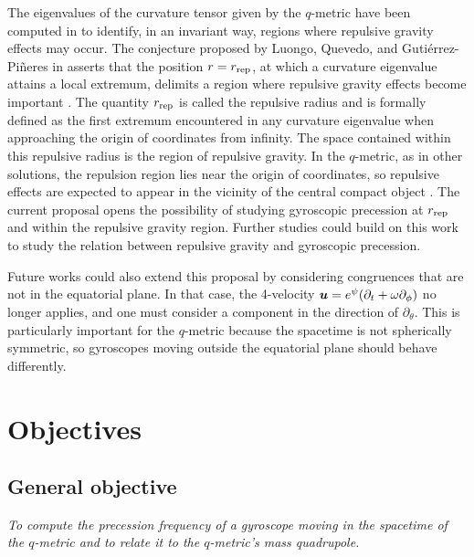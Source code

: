\documentclass[12pt]{article}
\begin{document}
The eigenvalues of the curvature tensor given by the $q$-metric have been computed in \cite{arrieta2021shadows} to identify, in an invariant way, regions where repulsive gravity effects may occur. The conjecture proposed by Luongo, Quevedo, and Gutiérrez-Piñeres in \cite{luongo2014characterizing, gutierrez2019c} asserts that the position $r=r_{\rm rep}$, at which a curvature eigenvalue attains a local extremum, delimits a region where repulsive gravity effects become important \cite{luongo2014characterizing}. The quantity $r_{\rm rep}$ is called the repulsive radius and is formally defined as the first extremum encountered in any curvature eigenvalue when approaching the origin of coordinates from infinity. The space contained within this repulsive radius is the region of repulsive gravity. In the $q$-metric, as in other solutions, the repulsion region lies near the origin of coordinates, so repulsive effects are expected to appear in the vicinity of the central compact object \cite{gutierrez2019c}. The current proposal opens the possibility of studying gyroscopic precession at $r_{\rm rep}$ and within the repulsive gravity region. Further studies could build on this work to study the relation between repulsive gravity and gyroscopic precession.

Future works could also extend this proposal by considering congruences that are not in the equatorial plane. In that case, the 4-velocity $\boldsymbol{u}=e^{\psi}(\partial_t+\omega\partial_\phi)$ no longer applies, and one must consider a component in the direction of $\partial_\theta$. This is particularly important for the $q$-metric because the spacetime is not spherically symmetric, so gyroscopes moving outside the equatorial plane should behave differently.




\section{Objectives}
\subsection{General objective}
{\it To compute the precession frequency of a gyroscope moving in the spacetime of the $q$-metric and to relate it to the $q$-metric's mass quadrupole.}
\end{document}
